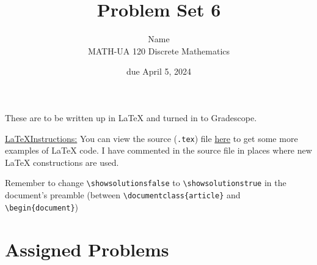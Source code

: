 \documentclass{article}
\title{Problem Set 6}
\author{%
    Name
\\  MATH-UA 120 Discrete Mathematics
}
\date{due April 5, 2024}
\newif\ifshowsolutions
\newcommand{\danger}{\marginpar[\hfill\dbend]{\dbend\hfill}}
\theoremstyle{definition}
\begin{document}
\maketitle



These are to be written up in \LaTeX{} and turned in to Gradescope.



\ifshowsolutions
    \SetupExSheets{solution/print=true}
\else
    \danger
 \underline{ \LaTeX  Instructions:}  You can view the source (\texttt{.tex}) file \href{https://bit.ly/4cCEb3d}{here} to get some more examples of \LaTeX{} code.  I have commented in the source file in places where new \LaTeX{} constructions are used.
  
  Remember to change \verb|\showsolutionsfalse| to \verb|\showsolutionstrue|
    in the document's preamble 
    (between \verb|\documentclass{article}| and \verb|\begin{document}|)
\fi

\section*{Assigned Problems}
\end{document}
